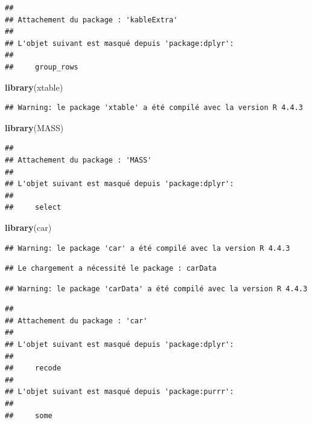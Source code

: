 \documentclass[
  12pt,
]{article}
\newenvironment{Shaded}{\begin{snugshade}}{\end{snugshade}}
\newcommand{\FunctionTok}[1]{\textcolor[rgb]{0.13,0.29,0.53}{\textbf{#1}}}
\newcommand{\NormalTok}[1]{#1}
\begin{document}
\begin{verbatim}
## 
## Attachement du package : 'kableExtra'
## 
## L'objet suivant est masqué depuis 'package:dplyr':
## 
##     group_rows
\end{verbatim}

\begin{Shaded}
\begin{Highlighting}[]
\FunctionTok{library}\NormalTok{(xtable)}
\end{Highlighting}
\end{Shaded}

\begin{verbatim}
## Warning: le package 'xtable' a été compilé avec la version R 4.4.3
\end{verbatim}

\begin{Shaded}
\begin{Highlighting}[]
\FunctionTok{library}\NormalTok{(MASS)}
\end{Highlighting}
\end{Shaded}

\begin{verbatim}
## 
## Attachement du package : 'MASS'
## 
## L'objet suivant est masqué depuis 'package:dplyr':
## 
##     select
\end{verbatim}

\begin{Shaded}
\begin{Highlighting}[]
\FunctionTok{library}\NormalTok{(car)}
\end{Highlighting}
\end{Shaded}

\begin{verbatim}
## Warning: le package 'car' a été compilé avec la version R 4.4.3
\end{verbatim}

\begin{verbatim}
## Le chargement a nécessité le package : carData
\end{verbatim}

\begin{verbatim}
## Warning: le package 'carData' a été compilé avec la version R 4.4.3
\end{verbatim}

\begin{verbatim}
## 
## Attachement du package : 'car'
## 
## L'objet suivant est masqué depuis 'package:dplyr':
## 
##     recode
## 
## L'objet suivant est masqué depuis 'package:purrr':
## 
##     some
\end{verbatim}
\end{document}
